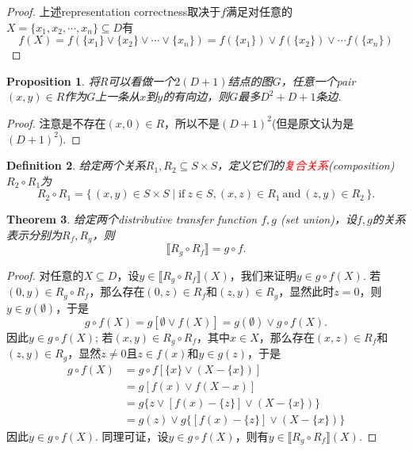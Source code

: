 \documentclass{article}
\newtheorem{theorem}{Theorem}[section]
\newtheorem{proposition}[theorem]{Proposition}
\newtheorem{definition}[theorem]{Definition}
\newcommand\Set[2]{\{\,#1\mid#2\,\}} %
\newcommand{\redt}[1]{\textcolor{red}{#1}}
\begin{document}
\begin{proof}
\rm 上述representation correctness取决于$f$满足对任意的$X = \{x_1,x_2,\cdots,x_n\} \subseteq D$有
$$
f(X) = f(\{x_1\} \vee \{x_2\} \vee \cdots \vee \{x_n\}) = f(\{x_1\}) \vee f(\{x_2\}) \vee \cdots f(\{x_n\})
$$ 
\end{proof}


\begin{proposition}
\rm 将$R$可以看做一个$2(D+1)$结点的图$G$，任意一个pair $(x,y) \in R$作为$G$上一条从$x$到$y$的有向边，则$G$最多$D^2 + D +1$条边.
\end{proposition}

\begin{proof}
注意是不存在$(x,0) \in R$，所以不是$(D+1)^2$(但是原文认为是$(D+1)^2$).
\end{proof}


\begin{definition}
\rm 给定两个关系$R_1,R_2 \subseteq S \times S$，定义它们的\redt{复合关系}(composition)$R_2 \circ R_1$为
$$
R_2 \circ R_1 = \Set{(x,y) \in S \times S}{\text{if}~ z \in S, (x,z) \in R_1~\text{and}~(z,y) \in R_2}.
$$
\end{definition}

\begin{theorem}
\rm 给定两个distributive transfer function $f,g$ (set union)，设$f,g$的关系表示分别为$R_f,R_g$，则
$$
\llbracket R_g \circ R_f \rrbracket = g \circ f. 
$$
\end{theorem}

\begin{proof}
\rm 对任意的$X \subseteq D$，设$y \in \llbracket R_g \circ R_f \rrbracket(X)$，我们来证明$y \in g \circ f(X)$. 若$(0,y) \in R_g \circ R_f$，那么存在$(0,z) \in R_f$和$(z,y) \in R_g$，显然此时$z = 0$，则$y \in g(\emptyset)$，于是
$$
g\circ f(X) = g[\emptyset \vee f(X)] = g(\emptyset) \vee g\circ f(X). 
$$ 
因此$y \in g\circ f(X)$; 若$(x,y) \in R_g \circ R_f$，其中$x \in X$，那么存在$(x,z) \in R_f$和$(z,y) \in R_g$，显然$z \neq 0$且$z \in f(x)$和$y \in g(z)$，于是
$$
\begin{aligned}
g \circ f(X) &= g \circ f[\{x\} \vee (X - \{x\})]\\ &
= g[f(x) \vee f(X - {x})]\\ 
&= g \{z  \vee [f(x) - \{z\}] \vee  (X - \{x\})\} \\
&= g(z) \vee g\{[f(x) - \{z\}] \vee  (X - \{x\})\}
\end{aligned}
$$
因此$y \in g \circ f(X)$. 同理可证，设$y \in g \circ f(X)$，则有$y \in \llbracket R_g \circ R_f \rrbracket(X)$. 
\end{proof}
\end{document}
